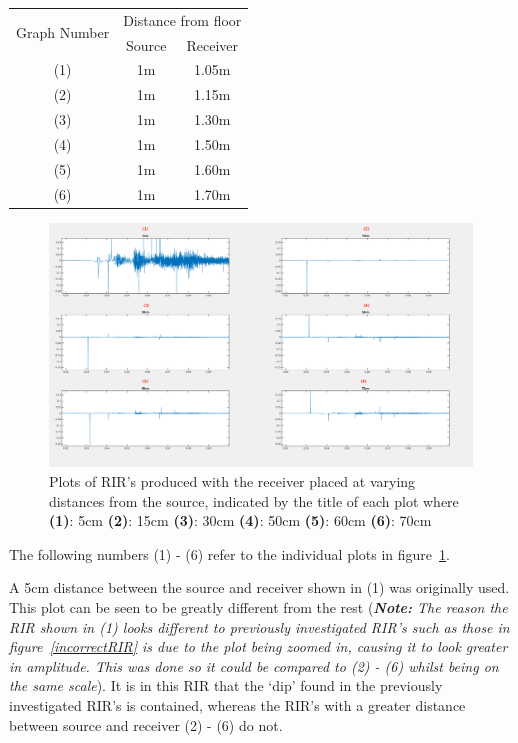 \documentclass[../../main.tex]{subfiles}
\begin{document}
			 \begin{center}
				 \begin{tabular}{|c |c| c|}
				 \hline
				 \multirow{2}{*}{Graph Number} & \multicolumn{2}{|c|}{Distance from floor} \\ \cline{2-3}
				 & Source & Receiver \\\hline
				 (1) & 1m & 1.05m \\
				 (2) & 1m & 1.15m \\
				 (3) & 1m & 1.30m \\
				 (4) & 1m & 1.50m \\
				 (5) & 1m & 1.60m \\
				 (6) & 1m & 1.70m \\ \hline
				 \end{tabular}
			 \end{center}

			\begin{figure}[h]
				\centerline{\includegraphics[scale = 0.32]{Sections/Implementation/Odeon/images/incorrectRIR/HeightTest_Edit.png}}
				\caption{Plots of \ac{RIR}'s produced with the receiver placed at varying distances from the source, indicated by the title of each plot where \textbf{(1)}: 5cm \textbf{(2)}: 15cm \textbf{(3)}: 30cm \textbf{(4)}: 50cm \textbf{(5)}: 60cm \textbf{(6)}: 70cm}
				\label{HeightTest}
			\end{figure}

			The following numbers (1) - (6) refer to the individual plots in figure~\ref{HeightTest}.

			A 5cm distance between the source and receiver shown in (1) was originally used. This plot can be seen to be greatly different from the rest (\textit{\textbf{Note:} The reason the \ac{RIR} shown in (1) looks different to previously investigated \ac{RIR}'s such as those in figure~\ref{incorrectRIR} is due to the plot being zoomed in, causing it to look greater in amplitude. This was done so it could be compared to (2) - (6) whilst being on the same scale}). It is in this \ac{RIR} that the `dip' found in the previously investigated \ac{RIR}'s is contained, whereas the \ac{RIR}'s with a greater distance between source and receiver (2) - (6) do not.
\end{document}
